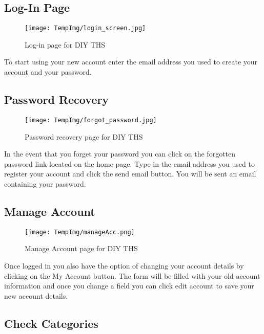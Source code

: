 \documentclass[fontsize=11pt]{extarticle}
\numberwithin{figure}{section} %
\numberwithin{table}{section}%
\begin{document}
\hypertarget{log-in-page}{%
\subsection{Log-In Page}\label{log-in-page}}

\begin{figure}[H]
      \centering
      \texttt{[image: TempImg/login\_screen.jpg]}
      \caption{Log-in page for DIY THS}
 \end{figure}

To start using your new account enter the email address you used to
create your account and your password.

\hypertarget{password-recovery}{%
\subsection{Password Recovery}\label{password-recovery}}

\begin{figure}[H]
      \centering
      \texttt{[image: TempImg/forgot\_password.jpg]}
      \caption{Password recovery page for DIY THS}
 \end{figure}

In the event that you forget your password you can click on the
forgotten password link located on the home page. Type in the email
address you used to register your account and click the send email
button. You will be sent an email containing your password.

\hypertarget{manage-account}{%
\subsection{Manage Account}\label{manage-account}}

\begin{figure}[H]
      \centering
      \texttt{[image: TempImg/manageAcc.png]}
      \caption{Manage Account page for DIY THS}
 \end{figure}

Once logged in you also have the option of changing your account details
by clicking on the My Account button. The form will be filled with your
old account information and once you change a field you can click edit
account to save your new account details.

\hypertarget{check-categories}{%
\subsection{Check Categories}\label{check-categories}}
\end{document}
